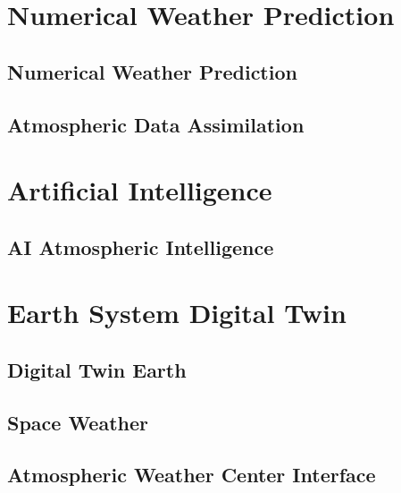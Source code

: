 \documentclass[11pt,a4paper,oneside]{report}
\begin{document}
\part{Numerical Weather Prediction}


\chapter{Numerical Weather Prediction}




\chapter{Atmospheric Data Assimilation}






\part{Artificial Intelligence}


\chapter{AI Atmospheric Intelligence}






\part{Earth System Digital Twin}


\chapter{Digital Twin Earth}




\chapter{Space Weather}




\chapter{Atmospheric Weather Center Interface}

\end{document}

